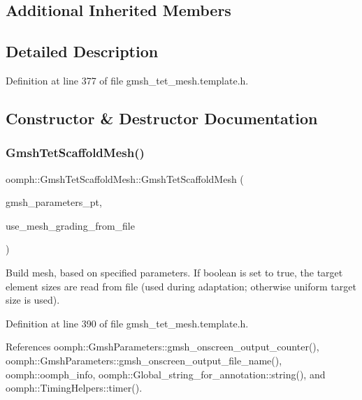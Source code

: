 \subsection*{Additional Inherited Members}


\subsection{Detailed Description}


Definition at line 377 of file gmsh\+\_\+tet\+\_\+mesh.\+template.\+h.



\subsection{Constructor \& Destructor Documentation}
\mbox{\label{classoomph_1_1GmshTetScaffoldMesh_a16430cc97edb1f4ec0eab6cfa5b94563}} 
\subsubsection{\texorpdfstring{Gmsh\+Tet\+Scaffold\+Mesh()}{GmshTetScaffoldMesh()}}
{\footnotesize\ttfamily oomph\+::\+Gmsh\+Tet\+Scaffold\+Mesh\+::\+Gmsh\+Tet\+Scaffold\+Mesh (\begin{DoxyParamCaption}\item[{\hyperlink{classoomph_1_1GmshParameters}{Gmsh\+Parameters} $\ast$}]{gmsh\+\_\+parameters\+\_\+pt,  }\item[{const bool \&}]{use\+\_\+mesh\+\_\+grading\+\_\+from\+\_\+file }\end{DoxyParamCaption})\hspace{0.3cm}{\ttfamily [inline]}}



Build mesh, based on specified parameters. If boolean is set to true, the target element sizes are read from file (used during adaptation; otherwise uniform target size is used). 



Definition at line 390 of file gmsh\+\_\+tet\+\_\+mesh.\+template.\+h.



References oomph\+::\+Gmsh\+Parameters\+::gmsh\+\_\+onscreen\+\_\+output\+\_\+counter(), oomph\+::\+Gmsh\+Parameters\+::gmsh\+\_\+onscreen\+\_\+output\+\_\+file\+\_\+name(), oomph\+::oomph\+\_\+info, oomph\+::\+Global\+\_\+string\+\_\+for\+\_\+annotation\+::string(), and oomph\+::\+Timing\+Helpers\+::timer().



